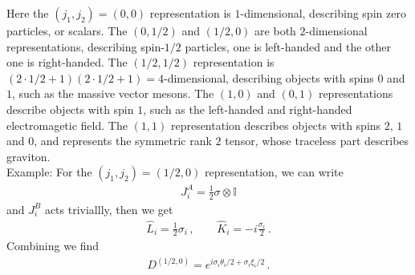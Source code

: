 \documentclass[11pt, onesided]{book}
\theoremstyle{break}
\theoremstyle{break}
\newcommand{\example}{\color{green}Example: \color{black}}
\begin{document}
%
%

Here the $(j_1, j_2) = (0,0)$ representation is $1$-dimensional, describing spin zero particles, or scalars. The $(0,1/2)$ and $(1/2,0)$ are both $2$-dimensional representations, describing spin-$1/2$ particles, one is left-handed and the other one is right-handed. The $(1/2,1/2)$ representation is $(2\cdot 1/2 + 1)(2\cdot 1/2+1) = 4$-dimensional, describing objects with spins $0$ and $1$, such as the massive vector mesons. The $(1,0)$ and $(0,1)$ representations describe objects with spin $1$, such as the left-handed and right-handed electromagetic field. The $(1,1)$ representation describes objects with spins $2,\,1\,$and $0$, and represents the symmetric rank $2$ tensor, whose traceless part describes graviton. \\


\example For the $(j_1,j_2) =(1/2,0)$ representation, we can write
\begin{align*}
 J_i^A=  \frac{1}{2}\sigma \otimes \mathbb{I}
\end{align*}
and $J_i^B$ acts triviallly, then we get
\begin{align*}
\hat{L}_i = \frac{1}{2}\sigma_i \,, \qquad \hat{K}_i = -i \frac{\sigma_i}{2}\,.
\end{align*}
Combining we find
\begin{align*}
D^{(1/2, 0)} = e^{i\sigma_i \theta_i /2 + \sigma_i\xi_i/2}\,.
\end{align*}
\end{document}
